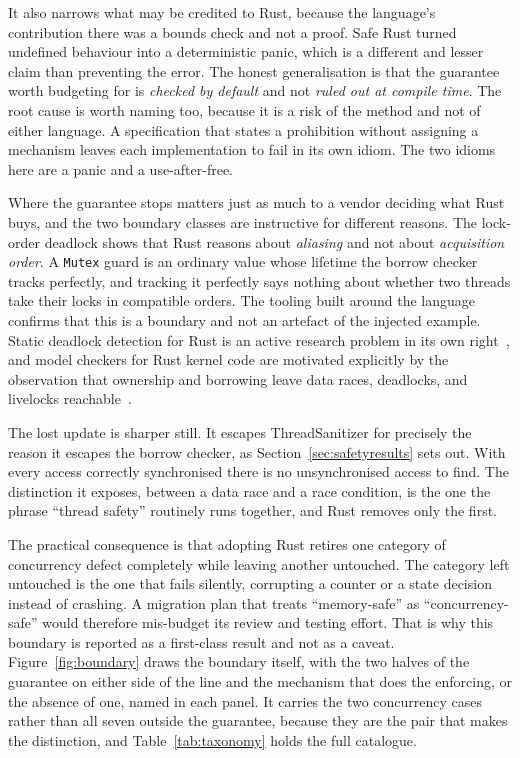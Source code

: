 \documentclass[english,oneside,a4paper,censored,csm,software-track-2020]{HYthesisML}
\begin{document}
It also
narrows what may be credited to Rust, because the language's contribution there was a bounds
check and not a proof. Safe Rust turned undefined behaviour into a deterministic panic, which
is a different and lesser claim than preventing the error. The honest generalisation is that
the guarantee worth budgeting for is \emph{checked by default} and not \emph{ruled out at
compile time}. The root cause is worth naming too, because it is a risk of the method
and not of either language. A specification that states a prohibition without assigning a
mechanism leaves each implementation to fail in its own idiom. The two idioms here are a
panic and a use-after-free.

Where the guarantee stops matters just as much to a vendor deciding what Rust buys, and the two
boundary classes are instructive for different reasons. The lock-order deadlock shows that Rust
reasons about \emph{aliasing} and not about \emph{acquisition order}. A \texttt{Mutex} guard is an
ordinary value whose lifetime the borrow checker tracks perfectly, and tracking it perfectly
says nothing about whether two threads take their locks in compatible orders. The tooling built
around the language confirms that this is a boundary and not an artefact of the injected example.
Static deadlock detection for Rust is an active research problem
in its own right~\cite{zhang2026deadlock}, and model checkers for Rust kernel code are motivated
explicitly by the observation that ownership and borrowing leave data races, deadlocks, and
livelocks reachable~\cite{tang2025converos}.

The lost update is sharper still. It escapes
ThreadSanitizer for precisely the reason it escapes the borrow checker, as
Section~\ref{sec:safetyresults} sets out. With every access correctly synchronised there is no
unsynchronised access to find. The distinction
it exposes, between a data race and a race
condition, is the one the phrase ``thread safety'' routinely runs together, and Rust removes only
the first.

The practical consequence is that adopting Rust retires one category of concurrency defect
completely while leaving another untouched. The category left untouched is the one that fails
silently, corrupting a counter or a state decision instead of crashing. A migration plan that
treats ``memory-safe'' as ``concurrency-safe'' would therefore mis-budget its review and testing
effort. That is why this boundary is reported as a first-class result and not as a caveat.
Figure~\ref{fig:boundary} draws the boundary itself, with the two halves of the
guarantee on either side of the line and the mechanism that does the enforcing, or the absence
of one, named in each panel. It carries the two concurrency cases rather than all seven outside
the guarantee, because they are the pair that makes the distinction, and
Table~\ref{tab:taxonomy} holds the full catalogue.
\end{document}
